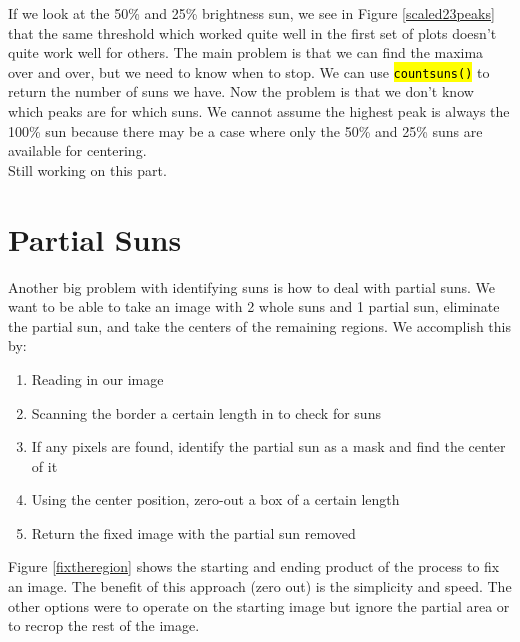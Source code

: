 \documentclass[10pt]{scrartcl}
\begin{document}
If we look at the 50\% and 25\% brightness sun, we see in Figure \ref{scaled23peaks} that the same threshold which worked quite well in the first set of plots doesn't quite work well for others. The main problem is that we can find the maxima over and over, but we need to know when to stop. We can use \hl{\texttt{countsuns()}} to return the number of suns we have. Now the problem is that we don't know which peaks are for which suns. We cannot assume the highest peak is always the 100\% sun because there may be a case where only the 50\% and 25\% suns are available for centering. \\

Still working on this part. 


\section{Partial Suns} %
\label{sec:partial_suns}
Another big problem with identifying suns is how to deal with partial suns. We want to be able to take an image with 2 whole suns and 1 partial sun, eliminate the partial sun, and take the centers of the remaining regions. We accomplish this by:

\begin{enumerate}
    \item Reading in our image
    \item Scanning the border a certain length in to check for suns
    \item If any pixels are found, identify the partial sun as a mask and find the center of it
    \item Using the center position, zero-out a box of a certain length
    \item Return the fixed image with the partial sun removed
\end{enumerate}

Figure \ref{fixtheregion} shows the starting and ending product of the process to fix an image. The benefit of this approach (zero out) is the simplicity and speed. The other options were to operate on the starting image but ignore the partial area or to recrop the rest of the image.
\end{document}
